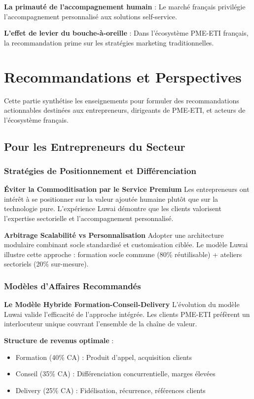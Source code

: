 \documentclass[12pt,a4paper]{report}
\begin{document}
\textbf{La primauté de l'accompagnement humain} : Le marché français privilégie l'accompagnement personnalisé aux solutions self-service.

\textbf{L'effet de levier du bouche-à-oreille} : Dans l'écosystème PME-ETI français, la recommandation prime sur les stratégies marketing traditionnelles.

\chapter{Recommandations et Perspectives}

Cette partie synthétise les enseignements pour formuler des recommandations actionnables destinées aux entrepreneurs, dirigeants de PME-ETI, et acteurs de l'écosystème français.

\section{Pour les Entrepreneurs du Secteur}

\subsection{Stratégies de Positionnement et Différenciation}

\textbf{Éviter la Commoditisation par le Service Premium}
Les entrepreneurs ont intérêt à se positionner sur la valeur ajoutée humaine plutôt que sur la technologie pure. L'expérience Luwai démontre que les clients valorisent l'expertise sectorielle et l'accompagnement personnalisé.

\textbf{Arbitrage Scalabilité vs Personnalisation}
Adopter une architecture modulaire combinant socle standardisé et customisation ciblée. Le modèle Luwai illustre cette approche : formation socle commune (80\% réutilisable) + ateliers sectoriels (20\% sur-mesure).

\subsection{Modèles d'Affaires Recommandés}

\textbf{Le Modèle Hybride Formation-Conseil-Delivery}
L'évolution du modèle Luwai valide l'efficacité de l'approche intégrée. Les clients PME-ETI préfèrent un interlocuteur unique couvrant l'ensemble de la chaîne de valeur.

\textbf{Structure de revenus optimale} :
\begin{itemize}
\item Formation (40\% CA) : Produit d'appel, acquisition clients
\item Conseil (35\% CA) : Différenciation concurrentielle, marges élevées  
\item Delivery (25\% CA) : Fidélisation, récurrence, références clients
\end{itemize}
\end{document}

